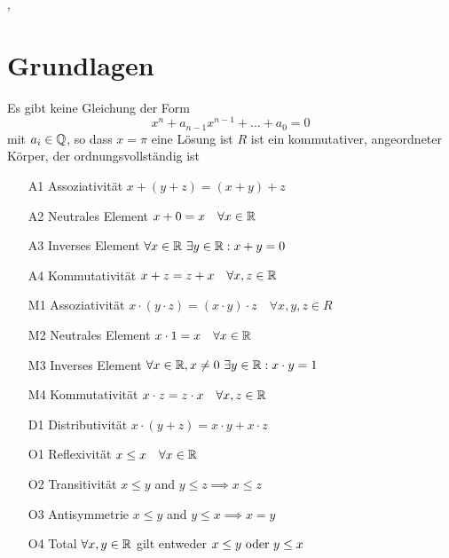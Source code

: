 \sep
\section{Grundlagen}
\Satz[1.1] Es gibt keine Gleichung der Form  \[x^n + a_{n-1}x^{n-1}+...+a_0 = 0\]
mit \(a_i \in \mathbb{Q} \), so dass \(x = \pi\) eine Lösung ist \newline
\Satz[1.2] \(R\) ist ein kommutativer, angeordneter Körper, der ordnungsvollständig ist \newline
{}
\begin{enumerate}
    \item [A1] Assoziativität \(x+(y+z) = (x+y)+z\)
    \item [A2] Neutrales Element \(x + 0 = x \quad \forall x \in \mathbb{R}\)
    \item [A3] Inverses Element \(\forall x \in \mathbb{R} \  \exists y \in \mathbb{R}: x+y=0\)
    \item [A4] Kommutativität \(x + z = z + x \quad \forall x,z \in \mathbb{R} \)
\end{enumerate}
\begin{enumerate}
    \item[M1] Assoziativität \(x \cdot (y \cdot z) = (x \cdot y) \cdot z \quad \forall x,y,z \in R\)
    \item[M2] Neutrales Element \(x \cdot 1 = x \quad \forall x \in \mathbb{R} \)
    \item[M3] Inverses Element \( \forall x \in \R, x \neq 0 \ \exists y \in \R : \newline x \cdot y = 1\)
    \item[M4] Kommutativität \( x \cdot z = z \cdot x \quad \forall x,z \in \mathbb{R} \)
\end{enumerate}
\Def[Distributivität]
\begin{enumerate}
    \item [D1] Distributivität \(x \cdot (y + z) = x \cdot y + x \cdot z\)
\end{enumerate}
\Def[Ordnungsaxiome]
\begin{enumerate}
    \item[O1] Reflexivität  \(x \leq x  \quad \forall x \in \mathbb{R} \)
    \item[O2] Transitivität \(x \leq y\) and \(y \leq z \implies x \leq z\)
    \item[O3] Antisymmetrie \(x \leq y\) and \(y \leq x \implies x = y\)
    \item[O4] Total \(\forall x,y \in \mathbb{R}\) gilt entweder \(x \leq y$ oder $y \leq x \)
\end{enumerate}
